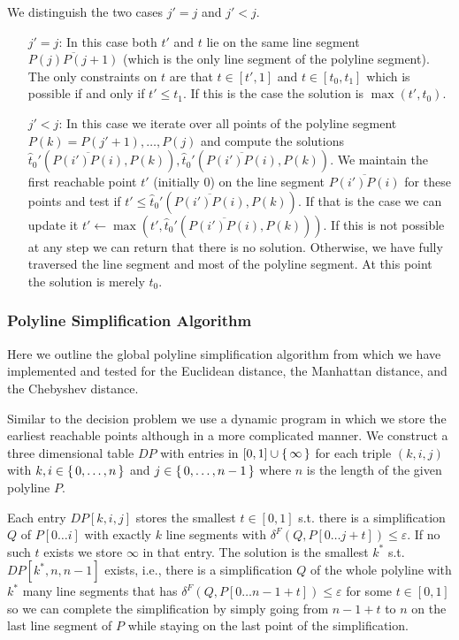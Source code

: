 We distinguish the two cases \(j' = j\) and \(j' < j\). 
\begin{enumerate}
  \item[\(j' = j\): ] In this case both \(t'\) and \(t\) lie on the same line segment \(\overline{P(j)P(j+1)}\) (which is the only line segment of the polyline segment). The only constraints on \(t\) are that \(t \in [t', 1]\) and \(t \in [ t_0, t_1]\) which is possible if and only if \(t' \leq t_1\). If this is the case the solution is \(\max(t', t_0)\).

  \item[\(j' < j\): ] In this case we iterate over all points of the polyline segment \(P(k) = P(j'+1), \dots, P(j)\) and compute the solutions \(\hat t_0'(\overline{P(i')P(i)}, P(k)), \hat t_0'(\overline{P(i')P(i)}, P(k))\). We maintain the first reachable point \(t'\) (initially \(0\)) on the line segment \(\overline{P(i')P(i)}\) for these points and test if \(t' \leq \hat t_0'(\overline{P(i')P(i)}, P(k))\). If that is the case we can update it \(t' \gets \max(t', \hat t_0'(\overline{P(i')P(i)}, P(k)))\). If this is not possible at any step we can return that there is no solution. Otherwise, we have fully traversed the line segment and most of the polyline segment. At this point the solution is merely \(t_0\).
\end{enumerate}

\subsubsection{Polyline Simplification Algorithm}
\label{ssec:simple_algo_main}

Here we outline the global polyline simplification algorithm from \citeauthor{on_optimal_polyline_simplification_using_the_hausdorff_and_frechet_distance} which we have implemented and tested for the Euclidean distance, the Manhattan distance, and the Chebyshev distance. 

Similar to the decision problem we use a dynamic program in which we store the earliest reachable points although in a more complicated manner. We construct a three dimensional table \(DP\) with entries in \([0, 1] \cup \set{\infty}\) for each triple \((k, i, j)\) with \(k, i \in \set{0, \dots, n}\) and \(j \in \set{0, \dots, n - 1}\) where \(n\) is the length of the given polyline \(P\). 

Each entry \(DP[k, i, j]\) stores the smallest \(t \in [0, 1]\) s.t. there is a simplification \(Q\) of \(P[0 \dots i]\) with exactly \(k\) line segments with \(\delta^F(Q, P[0\dots j + t]) \leq \varepsilon\). If no such \(t\) exists we store \(\infty\) in that entry. 
The solution is the smallest \(k^*\) s.t. \(DP[k^*, n, n - 1]\) exists, i.e., there is a simplification \(Q\) of the whole polyline with \(k^*\) many line segments that has \(\delta^F(Q, P[0\dots n - 1 + t]) \leq \varepsilon\) for some \(t \in [0, 1]\) so we can complete the simplification by simply going from \(n-1+t\) to \(n\) on the last line segment of \(P\) while staying on the last point of the simplification. 

